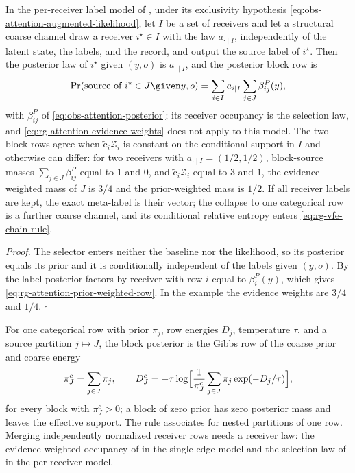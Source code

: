 In the per-receiver label model of , under its
exclusivity hypothesis \eqref{eq:obs-attention-augmented-likelihood}, let $I$ be a
set of receivers and let a structural coarse channel draw a receiver $i^\star\in I$
with the law $a_{\cdot\mid I}$, independently of the latent state, the labels, and
the record, and output the source label of $i^\star$. Then the posterior law of
$i^\star$ given $(y,o)$ is $a_{\cdot\mid I}$, and the posterior block row is
\begin{equation}
\Pr(\text{source of }i^\star\in J\given y,o)
=\sum_{i\in I}a_{i\mid I}\sum_{j\in J}\beta^P_{ij}(y),
\label{eq:rg-attention-prior-weighted-row}
\end{equation}
with $\beta^P_{ij}$ of \eqref{eq:obs-attention-posterior}; its receiver occupancy is
the selection law, and \eqref{eq:rg-attention-evidence-weights} does not apply to
this model. The two block rows agree when $\widetilde{\mathrm c}_i\mathcal Z_i$ is
constant on the conditional support in $I$ and otherwise can differ: for two
receivers with $a_{\cdot\mid I}=(1/2,1/2)$, block-source masses $\sum_{j\in
J}\beta^P_{ij}$ equal to $1$ and $0$, and $\widetilde{\mathrm c}_i\mathcal Z_i$ equal
to $3$ and $1$, the evidence-weighted mass of $J$ is $3/4$ and the prior-weighted
mass is $1/2$. If all receiver labels are kept, the exact meta-label is their
vector; the collapse to one categorical row is a further coarse channel, and its
conditional relative entropy enters \eqref{eq:rg-vfe-chain-rule}.

\noindent\emph{Proof.}
The selector enters neither the baseline nor the likelihood, so its posterior equals
its prior and it is conditionally independent of the labels given $(y,o)$. By
 the label posterior factors by receiver with row $i$
equal to $\beta^P_i(y)$, which gives \eqref{eq:rg-attention-prior-weighted-row}. In
the example the evidence weights are $3/4$ and $1/4$. $\square$

For one categorical row with prior $\pi_j$, row energies $D_j$, temperature $\tau$,
and a source partition $j\mapsto J$, the block posterior is the Gibbs row of the
coarse prior and coarse energy
\begin{equation}
\pi^c_J=\sum_{j\in J}\pi_j,
\qquad
D^c_J=-\tau\log\Bigl[\frac1{\pi^c_J}\sum_{j\in J}\pi_j\exp(-D_j/\tau)\Bigr],
\label{eq:rg-attention-log-sum-exp}
\end{equation}
for every block with $\pi^c_J>0$; a block of zero prior has zero posterior mass and
leaves the effective support. The rule associates for nested partitions of one row.
Merging independently normalized receiver rows needs a receiver law: the
evidence-weighted occupancy of  in the
single-edge model and the selection law of
 in the per-receiver model.


